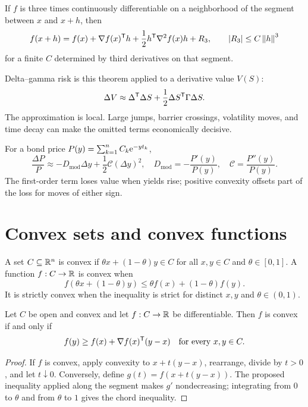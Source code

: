 \begin{theorem}
If $f$ is three times continuously differentiable on a neighborhood of the segment
between $x$ and $x+h$, then
\[
f(x+h)=f(x)+\nabla f(x)^\mathsf T h+
\frac12h^\mathsf T\nabla^2f(x)h+R_3,
\qquad \left|R_3\right|\leq C\left\lVert h\right\rVert^3
\]
for a finite $C$ determined by third derivatives on that segment.
\end{theorem}

Delta--gamma risk is this theorem applied to a derivative value $V(S)$:
\[
\Delta V\approx \Delta^\mathsf T\Delta S+
\frac12\Delta S^\mathsf T\Gamma\Delta S.
\]
The approximation is local. Large jumps, barrier crossings, volatility moves, and
time decay can make the omitted terms economically decisive.

\begin{example}
For a bond price $P(y)=\sum_{k=1}^n C_k\mathrm e^{-yt_k}$,
\[
\frac{\Delta P}{P}\approx
-D_{\mathrm{mod}}\Delta y+\frac12\mathcal C(\Delta y)^2,\quad
D_{\mathrm{mod}}=-\frac{P'(y)}{P(y)},\quad
\mathcal C=\frac{P''(y)}{P(y)}.
\]
The first-order term loses value when yields rise; positive convexity offsets part
of the loss for moves of either sign.
\end{example}

\section{Convex sets and convex functions}

\begin{definition}[Convexity]
A set $C\subseteq\mathbb R^n$ is convex if $\theta x+(1-\theta)y\in C$ for all $x,y\in C$
and $\theta\in[0,1]$. A function $f:C\to\mathbb R$ is convex when
\[
f(\theta x+(1-\theta)y)\leq\theta f(x)+(1-\theta)f(y).
\]
It is strictly convex when the inequality is strict for distinct $x,y$ and
$\theta\in(0,1)$.
\end{definition}

\begin{theorem}
Let $C$ be open and convex and let $f:C\to\mathbb R$ be differentiable. Then $f$ is convex
if and only if
\[
f(y)\geq f(x)+\nabla f(x)^\mathsf T(y-x)
\quad\text{for every }x,y\in C.
\]
\end{theorem}
\begin{proof}
If $f$ is convex, apply convexity to $x+t(y-x)$, rearrange, divide by $t>0$, and let
$t\downarrow0$. Conversely, define $g(t)=f(x+t(y-x))$. The proposed inequality
applied along the segment makes $g'$ nondecreasing; integrating from $0$ to
$\theta$ and from $\theta$ to $1$ gives the chord inequality.
\end{proof}

